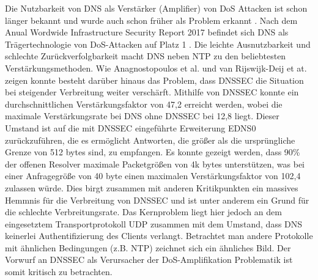 Die Nutzbarkeit von DNS als Verstärker (Amplifier) von DoS Attacken ist schon länger bekannt und wurde auch schon früher als Problem erkannt \cite{ICANN2006}. Nach dem Anual Wordwide Infrastructure Security Report 2017 befindet sich DNS als Trägertechnologie von DoS-Attacken auf Platz 1 \cite{Alcoy2017}. Die leichte Ausnutzbarkeit und schlechte Zurückverfolgbarkeit macht DNS neben NTP zu den beliebtesten Verstärkungsmethoden. Wie Anagnostopoulos et al.\cite{Anagnostopoulos2013} und van Rijswijk-Deij et at.\cite{VanRijswijk-Deij2014} zeigen konnte besteht darüber hinaus das Problem, dass DNSSEC die Situation bei steigender Verbreitung weiter verschärft. Mithilfe von DNSSEC konnte ein durchschnittlichen Verstärkungsfaktor von 47,2 erreicht werden, wobei die maximale Verstärkungsrate bei DNS ohne DNSSEC bei 12,8 liegt. Dieser Umstand ist auf die mit DNSSEC eingeführte Erweiterung EDNS0 zurückzuführen, die es ermöglicht Antworten, die größer als die ursprüngliche Grenze von 512 bytes sind, zu empfangen. Es konnte gezeigt werden, dass 90\% der offenen Resolver maximale Packetgrößen von 4k bytes unterstützen, was bei einer Anfragegröße von 40 byte einen maximalen Verstärkungsfaktor von 102,4 zulassen würde. Dies birgt zusammen mit anderen Kritikpunkten ein massives Hemmnis für die Verbreitung von DNSSEC und ist unter anderem ein Grund für die schlechte Verbreitungsrate. Das Kernproblem liegt hier jedoch an dem eingesetztem Transportprotokoll UDP zusammen mit dem Umstand, dass DNS keinerlei Authentifizierung des Clients verlangt. Betrachtet man andere Protokolle mit ähnlichen Bedingungen (z.B. NTP) zeichnet sich ein ähnliches Bild. Der Vorwurf an DNSSEC als Verursacher der DoS-Amplifikation Problematik ist somit kritisch zu betrachten.
